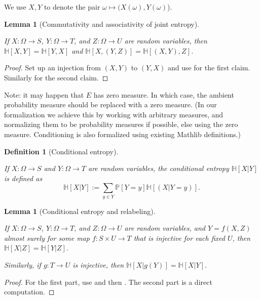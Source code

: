 \documentclass[10pt,a4paper]{article}
\newtheorem{lemma}[theorem]{Lemma}
\newtheorem{definition}[theorem]{Definition}
\newcommand{\lean}[1]{}
\newcommand{\uses}[1]{}
\newcommand{\leanok}{}
\newcommand{\bbH}{\mathbb{H}}
\newcommand{\bbP}{\mathbb{P}}
\begin{document}
We use $X,Y$ to denote the pair $\omega \mapsto (X(\omega),Y(\omega)$).

\begin{lemma}[Commutativity and associativity of joint entropy]
  \label{entropy-comm}
  \lean{ProbabilityTheory.entropy_comm, ProbabilityTheory.entropy_assoc}
  \leanok
  If $X: \Omega \to S$, $Y: \Omega \to T$, and $Z: \Omega \to U$ are random variables, then $\bbH[X, Y] = \bbH[Y, X]$ and $\bbH[X, (Y,Z)] = \bbH[(X,Y), Z]$.
\end{lemma}
\begin{proof}
  \leanok
  \uses{relabeled-entropy}
  Set up an injection from $(X,Y)$ to $(Y,X)$ and use  for the first claim. Similarly for the second claim.
\end{proof}


Note: it may happen that $E$ has zero measure.  In which case, the ambient probability measure should be replaced with a zero measure.  (In our formalization we achieve this by working with arbitrary measures, and normalizing them to be probability measures if possible, else using the zero measure.  Conditioning is also formalized using existing Mathlib definitions.)

\begin{definition}[Conditional entropy]
  \label{conditional-entropy-def}
  \uses{entropy-def,condition-event-def}
  \lean{ProbabilityTheory.condEntropy}
  \leanok
  If $X: \Omega \to S$ and $Y: \Omega \to T$ are random variables, the conditional entropy $\bbH[X|Y]$ is defined as
  $$ \bbH[X|Y] := \sum_{y \in Y} \bbP[Y = y] \bbH[(X | Y=y)].$$
\end{definition}

\begin{lemma}[Conditional entropy and relabeling]\label{relabeled-entropy-cond}
  \uses{conditional-entropy-def}
  \lean{ProbabilityTheory.condEntropy_comp_of_injective, ProbabilityTheory.condEntropy_of_injective'}\leanok
  If $X: \Omega \to S$, $Y: \Omega \to T$, and $Z: \Omega \to U$ are random variables, and $Y = f(X,Z)$ almost surely for some map $f: S \times U \to T$ that is injective for each fixed $U$, then $\bbH[X|Z] = \bbH[Y|Z]$.

  Similarly, if $g: T \to U$ is injective, then $\bbH[X|g(Y)] = \bbH[X|Y]$.
\end{lemma}

\begin{proof}
  \uses{relabeled-entropy}\leanok
  For the first part, use  and then .  The second part is a direct computation.
\end{proof}
\end{document}
